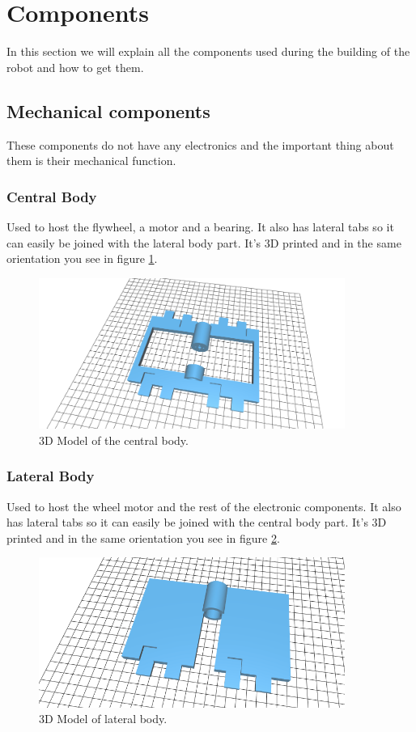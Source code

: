 \section{Components}
In this section we will explain all the components
used during the building of the robot and how to get them.

\subsection{Mechanical components}
These components do not have any electronics and the important
thing about them is their mechanical function.
\subsubsection{Central Body}

Used to host the flywheel, a motor and a bearing. It also has lateral
tabs so it can easily be joined with the lateral body part.
It's 3D printed and in the same orientation you see in figure
\ref{fig: central body}.
\begin{figure}[H]
    \centering
    \includegraphics[width=10cm]{img/components/central_body.png}
    \caption{3D Model of the central body.}
    \label{fig: central body}
\end{figure}

\subsubsection{Lateral Body}
Used to host the wheel motor and the rest of the electronic components. 
It also has lateral tabs so it can easily be joined with the central body part.
It's 3D printed and in the same orientation you see in figure
\ref{fig: lateral body}.
\begin{figure}[H]
    \centering
    \includegraphics[width=10cm]{img/components/lateral_body.png}
    \caption{3D Model of lateral body.}
    \label{fig: lateral body}
\end{figure}
